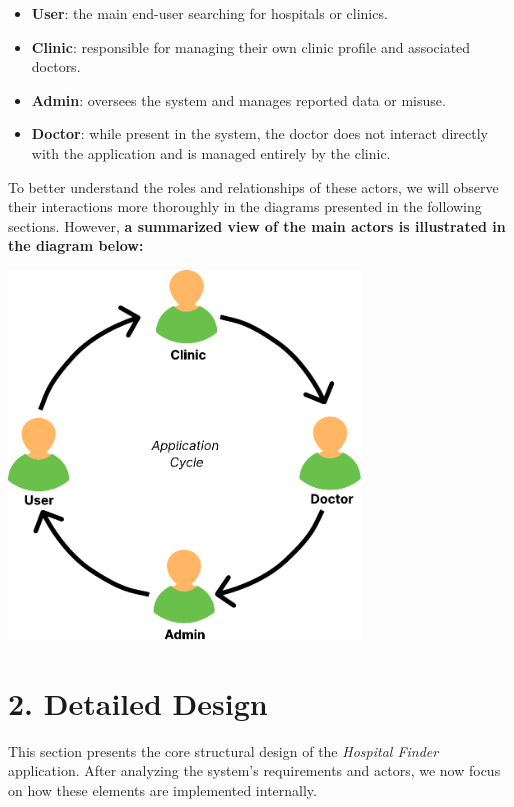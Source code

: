 \documentclass[12pt]{report}
\begin{document}
\begin{itemize}
    \item \textbf{User}: the main end-user searching for hospitals or clinics.
    \item \textbf{Clinic}: responsible for managing their own clinic profile and associated doctors.
    \item \textbf{Admin}: oversees the system and manages reported data or misuse.
    \item \textbf{Doctor}: while present in the system, the doctor does not interact directly with the application and is managed entirely by the clinic.
\end{itemize}
\newpage
\noindent To better understand the roles and relationships of these actors, we will observe their interactions more thoroughly in the diagrams presented in the following sections. However, \textbf{ a summarized view of the main actors is illustrated in the diagram below: }
\vspace*{0.6cm}
\begin{center}
    \includegraphics[width=0.7\textwidth]{images/appcucle@2x.pdf}
\end{center}

\section*{2. Detailed Design}

This section presents the core structural design of the \textit{Hospital Finder} application. After analyzing the system’s requirements and actors, we now focus on how these elements are implemented internally.
\end{document}

